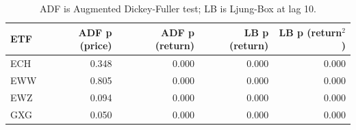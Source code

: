 \begin{table}[!htbp]
\centering
\caption{Stationarity and serial dependence diagnostics.}
\label{tab:diagnostics}
\begin{tabular}{lrrrr}
\toprule
ETF & ADF p (price) & ADF p (return) & LB p (return) & LB p (return$^2$) \\
\midrule
ECH & 0.348 & 0.000 & 0.000 & 0.000 \\
EWW & 0.805 & 0.000 & 0.000 & 0.000 \\
EWZ & 0.094 & 0.000 & 0.000 & 0.000 \\
GXG & 0.050 & 0.000 & 0.000 & 0.000 \\
\bottomrule
\end{tabular}
\caption*{\footnotesize ADF is Augmented Dickey-Fuller test; LB is Ljung-Box at lag 10.}
\end{table}
